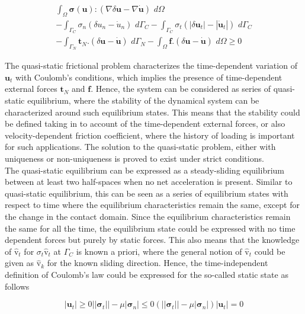 \begin{multline}\label{fric_con_quasi}
\int_{\Omega}  \bm{\sigma}(\bm{u}):(\nabla \delta \bm{u}-\nabla \bm{\dot{u}}) \,\,d\Omega\\
 - \int_{\Gamma_C} \sigma_n(\delta{u}_n-{\dot{u}}_n) \,\, d\Gamma_C - \int_{\Gamma_C} \sigma_t(|\delta{\bm{u}}_t|-|{\dot{\bm{u}}}_t|) \,\, d\Gamma_C\\
  -  \int_{\Gamma_N} \bm{t}_N.(\delta \bm{u}-\bm{\dot{u}}) \,\, d\Gamma_N- \int_{\Omega} \bm{f}.(\delta \bm{u}-\bm{\dot{u}}) \,\, d\Omega \geq 0
\end{multline}
 
The quasi-static frictional problem characterizes the time-dependent variation of $\bm{u}_t$ with Coulomb's conditions, which implies the presence of time-dependent external forces $\bm{t}_N$ and $\bm{f}$. Hence, the system can be considered as series of quasi-static equilibrium, where the stability of the dynamical system can be characterized around such equilibrium states. 
This means that the stability could be defined taking in to account of the time-dependent external forces, or also velocity-dependent friction coefficient, where the history of loading is important for such applications. The solution to the quasi-static problem, either with uniqueness or non-uniqueness is proved to exist under strict conditions.\\

The quasi-static equilibrium can be expressed as a steady-sliding equilibrium between at least two half-spaces when no net acceleration is present. Similar to quasi-static equilibrium, this can be seen as a series of equilibrium states with respect to time where the equilibrium characteristics remain the same, except for the change in the contact domain. Since the equilibrium characteristics remain the same for all the time, the equilibrium state could be expressed with no time dependent forces but purely by static forces. This also means that the knowledge of $\bm{\hat{\mathrm v}}_t$ for ${\sigma}_t\bm{\hat{\mathrm v}}_t$ at $\Gamma_C$ is known a priori, where the general notion of  $\bm{\hat{\mathrm v}}_t$ could be given as  $\bm{\hat{\mathrm v}}_k$ for the known sliding direction. Hence, the time-independent definition of Coulomb's law could be expressed for the so-called static state as follows

\begin{subequations}
\begin{equation}
|\bm{{u}}_t| \geq 0
\end{equation} 

\begin{equation}
||\bm\sigma_{t}||-\mu|\bm\sigma_{n}| \leq 0
\end{equation}

\begin{equation}
 (||\bm\sigma_{t}||-\mu|\bm\sigma_{n}|)|\bm{{u}}_t| = 0
\end{equation}

\end{subequations}
   

